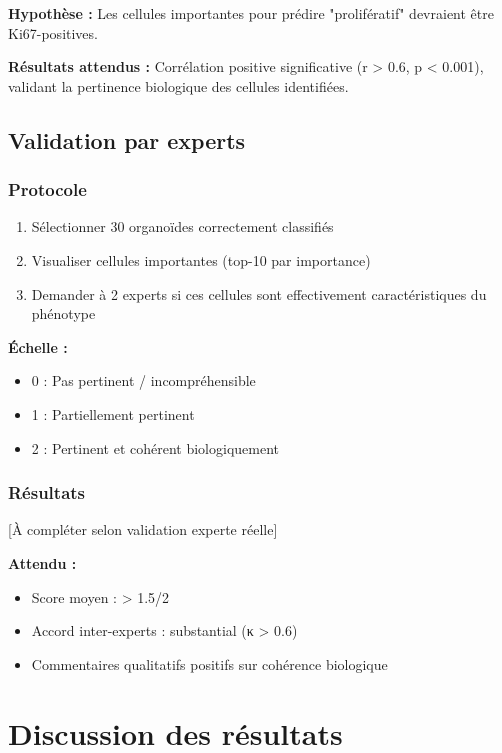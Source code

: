 \textbf{Hypothèse :}
Les cellules importantes pour prédire "prolifératif" devraient être Ki67-positives.

\textbf{Résultats attendus :}
Corrélation positive significative (r > 0.6, p < 0.001), validant la pertinence biologique des cellules identifiées.

\subsection{Validation par experts}

\subsubsection{Protocole}

\begin{enumerate}
    \item Sélectionner 30 organoïdes correctement classifiés
    \item Visualiser cellules importantes (top-10 par importance)
    \item Demander à 2 experts si ces cellules sont effectivement caractéristiques du phénotype
\end{enumerate}

\textbf{Échelle :}
\begin{itemize}
    \item 0 : Pas pertinent / incompréhensible
    \item 1 : Partiellement pertinent
    \item 2 : Pertinent et cohérent biologiquement
\end{itemize}

\subsubsection{Résultats}

[À compléter selon validation experte réelle]

\textbf{Attendu :}
\begin{itemize}
    \item Score moyen : > 1.5/2
    \item Accord inter-experts : substantial (κ > 0.6)
    \item Commentaires qualitatifs positifs sur cohérence biologique
\end{itemize}

\section{Discussion des résultats}

